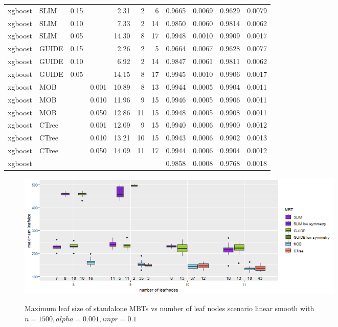 \begin{table}
\begin{tabular}[t]{l|l|r|r|r|r|r|r|r|r|r}
xgboost & SLIM & 0.15 & & 2.31 & 2 & 6 & 0.9665 & 0.0069 & 0.9629 & 0.0079\\
xgboost & SLIM & 0.10 & & 7.33 & 2 & 14 & 0.9850 & 0.0060 & 0.9814 & 0.0062\\
xgboost & SLIM & 0.05 & & 14.30 & 8 & 17 & 0.9948 & 0.0010 & 0.9909 & 0.0017\\
xgboost & GUIDE & 0.15 & & 2.26 & 2 & 5 & 0.9664 & 0.0067 & 0.9628 & 0.0077\\
xgboost & GUIDE & 0.10 & & 6.92 & 2 & 14 & 0.9847 & 0.0061 & 0.9811 & 0.0062\\
xgboost & GUIDE & 0.05 & & 14.15 & 8 & 17 & 0.9945 & 0.0010 & 0.9906 & 0.0017\\
xgboost & MOB & & 0.001 & 10.89 & 8 & 13 & 0.9944 & 0.0005 & 0.9904 & 0.0011\\
xgboost & MOB & & 0.010 & 11.96 & 9 & 15 & 0.9946 & 0.0005 & 0.9906 & 0.0011\\
xgboost & MOB & & 0.050 & 12.86 & 11 & 15 & 0.9948 & 0.0005 & 0.9908 & 0.0011\\
xgboost & CTree & & 0.001 & 12.09 & 9 & 15 & 0.9940 & 0.0006 & 0.9900 & 0.0012\\
xgboost & CTree & & 0.010 & 13.21 & 10 & 15 & 0.9943 & 0.0006 & 0.9902 & 0.0013\\
xgboost & CTree & & 0.050 & 14.09 & 11 & 17 & 0.9944 & 0.0006 & 0.9904 & 0.0012\\
\hline
xgboost &  & & &  &  &  & 0.9858 & 0.0008 & 0.9768 & 0.0018\\
\hline
\end{tabular}
\label{tab:app_linear_smooth_1000}
\end{table}


\begin{figure}
\caption{Maximum leaf size of standalone MBTs vs number of leaf nodes scenario linear smooth with $n=1500, alpha = 0.001, impr = 0.1$}
    \includegraphics[width=16cm]{Figures/simulations/batchtools/basic_scenarios/linear_smooth/ls_1000_standalone_symmetrie.png}
    \label{fig:app_ls_1000_standalone_symmetrie}
\end{figure} 


